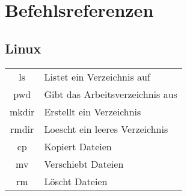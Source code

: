 \section{Befehlsreferenzen}
\subsection{Linux}
\begin{tabular}[h!]{cl}
  ls     & Listet ein Verzeichnis auf \\
  pwd    & Gibt das Arbeitsverzeichnis aus \\
  mkdir  & Erstellt ein Verzeichnis \\
  rmdir  & Loescht ein leeres Verzeichnis \\
  cp     & Kopiert Dateien \\
  mv     & Verschiebt Dateien \\
  rm     & Löscht Dateien
\end{tabular}
